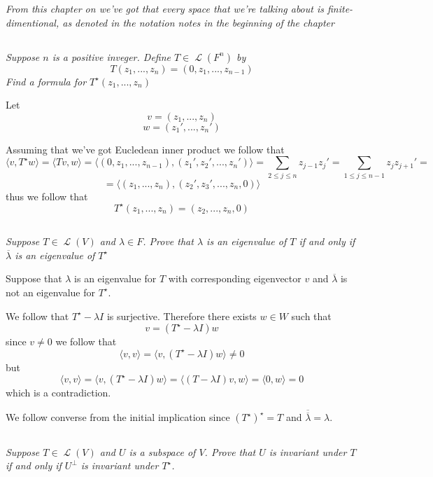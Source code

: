 \documentclass[11pt,oneside,titlepage]{book}
\DeclareMathOperator \map {\mathcal {L}}
\newcommand{\eangle}[1]{\langle #1 \rangle}
\begin{document}
\textit{From this chapter on we've got that every space that we're talking
  about is finite-dimentional, as denoted in the notation notes in
  the beginning of the chapter}

\subsection{}

\textit{Suppose $n$ is a positive inveger. Define $T \in \map(F^n)$ by 
$$T(z_1, ..., z_n) = (0, z_1, ..., z_{n - 1})$$
Find a formula for $T^\star(z_1, ..., z_n)$}

Let
$$v = (z_1, ..., z_n)$$
$$w = (z_1', ..., z_n')$$

Assuming that we've got Eucledean inner product we follow that
$$\eangle{v, T^\star w} = \eangle{T v,  w} =
\eangle{(0, z_1, ..., z_{n - 1}),  (z_1', z_2', ..., z_n')} =
\sum_{2 \leq j \leq n}{z_{j - 1} z_{j}'} =
\sum_{1 \leq j \leq n - 1}{z_{j} z_{j + 1}'} =
$$
$$ = \eangle{(z_1, ..., z_{n}),  (z_2', z_3', ..., z_{n}, 0)} $$
thus we follow that
$$T^\star (z_1, ..., z_n) = (z_2, ..., z_n, 0)$$

\subsection{}

\textit{Suppose $T \in \map(V)$ and $\lambda \in F$. Prove that $\lambda$ is an eigenvalue of
  $T$ if and only if $\overline{\lambda}$ is an eigenvalue of $T^\star$ }

Suppose that $\lambda$ is an eigenvalue for $T$ with corresponding eigenvector $v$ and
$\overline{\lambda}$ is not an eigenvalue for $T^\star$. 

We follow that $T^\star - \lambda I$ is surjective. Therefore there exists $w \in W$ such that
$$v = (T^\star - \lambda I)w $$
since $v \neq 0$ we follow that
$$\eangle{v, v} = \eangle{v, (T^\star - \lambda I)w} \neq 0$$
but
$$\eangle{v, v} = \eangle{v, (T^\star - \lambda I)w} = \eangle{(T - \lambda I)v, w} =
\eangle{0, w} = 0$$
which is a contradiction.

We follow converse from the initial implication since $(T^\star)^\star = T$ and
$\overline{\overline{\lambda}} = \lambda$.


\subsection{}

\textit{Suppose $T \in \map(V)$ and $U$ is a subspace of $V$. Prove that $U$ is invariant under
  $T$ if and only if $U^\perp$ is invariant under $T^\star$.}
\end{document}

